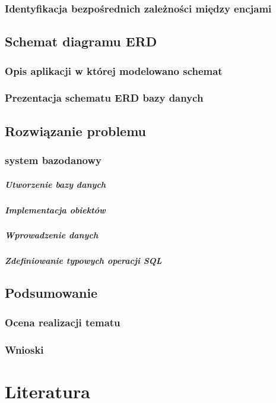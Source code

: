 \documentclass[polish, 11pt]{article}
\begin{document}
	    \subsubsection{Identyfikacja bezpośrednich zależności między encjami}
    
    \subsection{Schemat diagramu ERD}
	    \subsubsection{Opis aplikacji w której modelowano schemat}
	    
	    \subsubsection{Prezentacja schematu ERD bazy danych}

    \subsection{Rozwiązanie problemu}
	    \subsubsection{system bazodanowy}
		    \subparagraph{Utworzenie bazy danych}
		    
		    \subparagraph{Implementacja obiektów}
		    
		    \subparagraph{Wprowadzenie danych}
		    
		    \subparagraph{Zdefiniowanie typowych operacji SQL}

    \subsection{Podsumowanie}
	    \subsubsection{Ocena realizacji tematu}
	    
		\subsubsection{Wnioski}

\section{Literatura}
\end{document}
